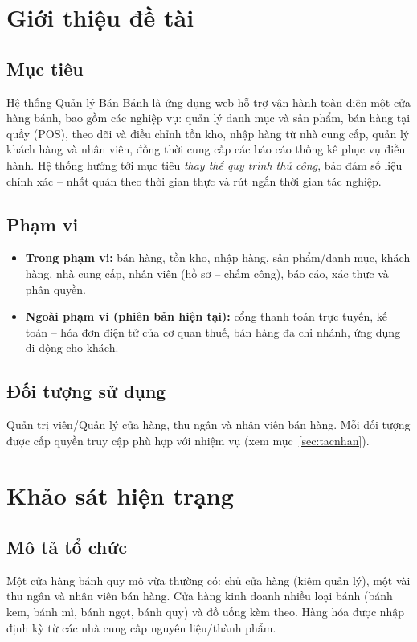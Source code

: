 \documentclass[12pt,a4paper]{report}
\begin{document}
\section{Giới thiệu đề tài}

\subsection{Mục tiêu}
Hệ thống Quản lý Bán Bánh là ứng dụng web hỗ trợ vận hành toàn diện một cửa hàng bánh, bao gồm các nghiệp vụ: quản lý danh mục và sản phẩm, bán hàng tại quầy (POS), theo dõi và điều chỉnh tồn kho, nhập hàng từ nhà cung cấp, quản lý khách hàng và nhân viên, đồng thời cung cấp các báo cáo thống kê phục vụ điều hành. Hệ thống hướng tới mục tiêu \emph{thay thế quy trình thủ công}, bảo đảm số liệu chính xác -- nhất quán theo thời gian thực và rút ngắn thời gian tác nghiệp.

\subsection{Phạm vi}
\begin{itemize}[leftmargin=1.4cm,nosep]
  \item \textbf{Trong phạm vi:} bán hàng, tồn kho, nhập hàng, sản phẩm/danh mục, khách hàng, nhà cung cấp, nhân viên (hồ sơ -- chấm công), báo cáo, xác thực và phân quyền.
  \item \textbf{Ngoài phạm vi (phiên bản hiện tại):} cổng thanh toán trực tuyến, kế toán -- hóa đơn điện tử của cơ quan thuế, bán hàng đa chi nhánh, ứng dụng di động cho khách.
\end{itemize}

\subsection{Đối tượng sử dụng}
Quản trị viên/Quản lý cửa hàng, thu ngân và nhân viên bán hàng. Mỗi đối tượng được cấp quyền truy cập phù hợp với nhiệm vụ (xem mục~\ref{sec:tacnhan}).

\section{Khảo sát hiện trạng}

\subsection{Mô tả tổ chức}
Một cửa hàng bánh quy mô vừa thường có: chủ cửa hàng (kiêm quản lý), một vài thu ngân và nhân viên bán hàng. Cửa hàng kinh doanh nhiều loại bánh (bánh kem, bánh mì, bánh ngọt, bánh quy) và đồ uống kèm theo. Hàng hóa được nhập định kỳ từ các nhà cung cấp nguyên liệu/thành phẩm.
\end{document}
